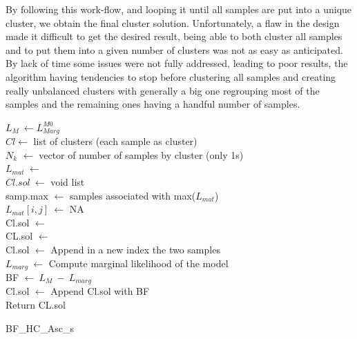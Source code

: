 \documentclass[twocolumn]{article}
\begin{document}
By following this work-flow, and looping it until all samples are put into a unique cluster, we obtain the final cluster solution.
Unfortunately, a flaw in the design made it difficult to get the desired result, being able to both cluster all samples and to put them into a given number of clusters was not as easy as anticipated.
By lack of time some issues were not fully addressed, leading to poor results, the algorithm having tendencies to stop before clustering all samples and creating really unbalanced clusters with generally a big one regrouping most of the samples and the remaining ones having a handful number of samples.
\begin{algorithm}[!]
 \BlankLine
 $L_M\ \leftarrow L_{Marg}^{M0}$\\
 $Cl \leftarrow$ list of clusters (each sample as cluster)\\
 $N_k$ $\leftarrow$ vector of number of samples by cluster (only 1s)\\
 $L_{mat}\ \leftarrow$ \\
 $Cl.sol\ \leftarrow$ void list\\
 \BlankLine
    {
       samp.max $\leftarrow$ samples associated with max($L_{mat}$)\\
       $L_{mat}[i,j]\ \leftarrow$ NA\\
       {
        Cl.sol $\leftarrow$ \\
       }
       {
        CL.sol $\leftarrow$ \\
       }
       \Else
       {
        Cl.sol $\leftarrow$ Append in a new index the two samples\\
       }
    }
    $L_{marg}\ \leftarrow$ Compute marginal likelihood of the model\\
    BF $\leftarrow\ L_M\ -\ L_{marg}$\\
    Cl.sol $\leftarrow$ Append Cl.sol with BF\\
    Return CL.sol
 \caption{BF\_HC\_Asc\_s}
\end{algorithm}
\end{document}
